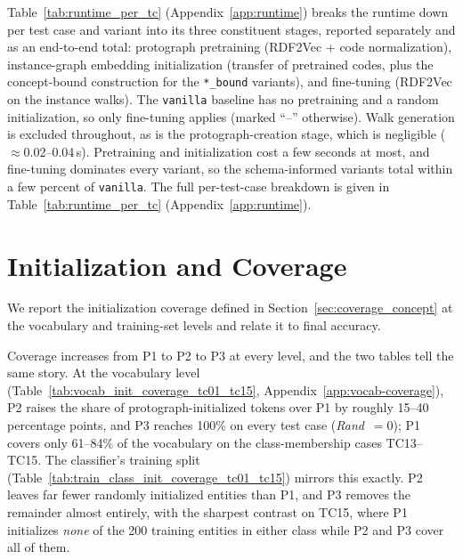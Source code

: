 \documentclass[a4paper,oneside,bibliography=totoc]{scrbook}
\begin{document}
Table~\ref{tab:runtime_per_tc} (Appendix~\ref{app:runtime}) breaks the runtime
down per test case and variant into its three constituent stages, reported
separately and as an end-to-end total: protograph pretraining (RDF2Vec + code normalization),
instance-graph embedding initialization (transfer of pretrained codes, plus the
concept-bound construction for the \texttt{*\_bound} variants), and fine-tuning
(RDF2Vec on the instance walks). The \texttt{vanilla} baseline has no pretraining
and a random initialization, so only fine-tuning applies (marked ``--''
otherwise). Walk generation is excluded throughout, as is the
protograph-creation stage, which is negligible ($\approx$0.02--0.04\,s).
Pretraining and initialization cost a few seconds at most, and fine-tuning
dominates every variant, so the schema-informed variants total within a few
percent of \texttt{vanilla}. The full per-test-case breakdown is given in
Table~\ref{tab:runtime_per_tc} (Appendix~\ref{app:runtime}).

\section{Initialization and Coverage}
\label{sec:coverage}

We report the initialization coverage defined in
Section~\ref{sec:coverage_concept} at the vocabulary and
training-set levels and relate it to final accuracy.

Coverage increases from P1 to P2 to P3 at every level, and the two tables tell
the same story. At the vocabulary level
(Table~\ref{tab:vocab_init_coverage_tc01_tc15}, Appendix~\ref{app:vocab-coverage}),
P2 raises the share of protograph-initialized tokens over P1 by roughly 15--40
percentage points, and P3 reaches 100\% on every test case (\emph{Rand}~$=0$); P1
covers only 61--84\% of the vocabulary on the class-membership cases TC13--TC15. The
classifier's training split (Table~\ref{tab:train_class_init_coverage_tc01_tc15})
mirrors this exactly. P2 leaves far fewer randomly initialized entities than P1, and
P3 removes the remainder almost entirely, with the sharpest contrast on TC15, where
P1 initializes \emph{none} of the 200 training entities in either class while P2 and
P3 cover all of them.
\end{document}
